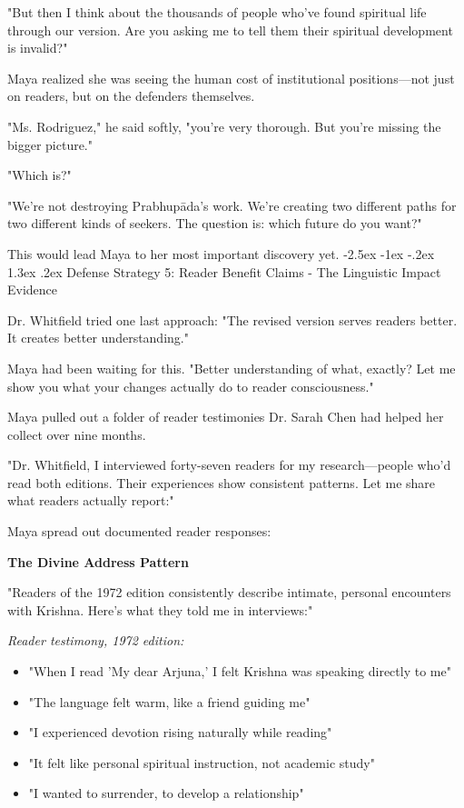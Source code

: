\documentclass[12pt,twoside]{book}
\makeatletter
\renewcommand\section{\@startsection{section}{1}{\z@}%
{-2.5ex \@plus -1ex \@minus -.2ex}%
{1.3ex \@plus.2ex}%
{\normalfont\Large\bfseries}}
\makeatother
\begin{document}
"But then I think about the thousands of people who've found spiritual life through our version. Are you asking me to tell them their spiritual development is invalid?"

Maya realized she was seeing the human cost of institutional positions—not just on readers, but on the defenders themselves.

"Ms. Rodriguez," he said softly, "you're very thorough. But you're missing the bigger picture."

"Which is?"

"We're not destroying Prabhupāda's work. We're creating two different paths for two different kinds of seekers. The question is: which future do you want?"

This would lead Maya to her most important discovery yet.
\section{Defense Strategy 5: Reader Benefit Claims - The Linguistic Impact Evidence}
\label{sec:org4672ee9}

Dr. Whitfield tried one last approach: "The revised version serves readers better. It creates better understanding."

Maya had been waiting for this. "Better understanding of what, exactly? Let me show you what your changes actually do to reader consciousness."

Maya pulled out a folder of reader testimonies Dr. Sarah Chen had helped her collect over nine months.

"Dr. Whitfield, I interviewed forty-seven readers for my research—people who'd read both editions. Their experiences show consistent patterns. Let me share what readers actually report:"

Maya spread out documented reader responses:

\textbf{\textbf{The Divine Address Pattern}}

"Readers of the 1972 edition consistently describe intimate, personal encounters with Krishna. Here's what they told me in interviews:"

\emph{Reader testimony, 1972 edition:}
\begin{itemize}
\item "When I read 'My dear Arjuna,' I felt Krishna was speaking directly to me"
\item "The language felt warm, like a friend guiding me"
\item "I experienced devotion rising naturally while reading"
\item "It felt like personal spiritual instruction, not academic study"
\item "I wanted to surrender, to develop a relationship"
\end{itemize}
\end{document}
